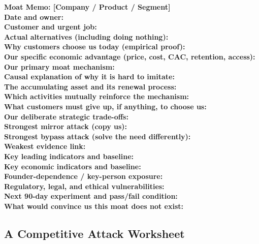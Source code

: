 \begin{tcolorbox}[colback=white,colframe=black!75,arc=1mm,title=\textbf{Moat Memo Template: Single-Page Strategic Audit}]
\small
\noindent\textbf{Moat Memo: [Company / Product / Segment]} \\
\textbf{Date and owner:} \\
\textbf{Customer and urgent job:} \\
\textbf{Actual alternatives (including doing nothing):} \\
\textbf{Why customers choose us today (empirical proof):} \\
\textbf{Our specific economic advantage (price, cost, CAC, retention, access):} \\
\textbf{Our primary moat mechanism:} \\
\textbf{Causal explanation of why it is hard to imitate:} \\
\textbf{The accumulating asset and its renewal process:} \\
\textbf{Which activities mutually reinforce the mechanism:} \\
\textbf{What customers must give up, if anything, to choose us:} \\
\textbf{Our deliberate strategic trade-offs:} \\
\textbf{Strongest mirror attack (copy us):} \\
\textbf{Strongest bypass attack (solve the need differently):} \\
\textbf{Weakest evidence link:} \\
\textbf{Key leading indicators and baseline:} \\
\textbf{Key economic indicators and baseline:} \\
\textbf{Founder-dependence / key-person exposure:} \\
\textbf{Regulatory, legal, and ethical vulnerabilities:} \\
\textbf{Next 90-day experiment and pass/fail condition:} \\
\textbf{What would convince us this moat does not exist:}
\end{tcolorbox}

\subsection{A Competitive Attack Worksheet}
\label{sec:competitive_attack_worksheet}

